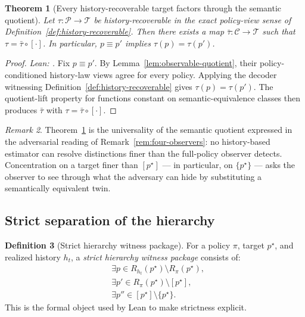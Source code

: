 \documentclass[11pt]{article}
\newtheorem{theorem}{Theorem}[section]
\theoremstyle{definition}
\newtheorem{definition}[theorem]{Definition}
\theoremstyle{remark}
\newtheorem{remark}[theorem]{Remark}
\theoremstyle{plain}
\theoremstyle{definition}
\newcommand{\Ccal}{\mathcal{C}}
\newcommand{\Pcal}{\mathcal{P}}
\begin{document}
\begin{theorem}[Every history-recoverable target factors through the semantic quotient]
\label{thm:factor-through-quotient}
Let $\tau:\Pcal\to\mathcal{T}$ be history-recoverable in the exact policy-view sense of Definition~\ref{def:history-recoverable}. Then there exists a map $\bar\tau:\Ccal\to\mathcal{T}$ such that $\tau=\bar\tau\circ[\cdot]$. In particular, $p\equiv p'$ implies $\tau(p)=\tau(p')$.
\end{theorem}

\begin{proof}
\noindent\emph{Lean: .}
Fix $p\equiv p'$. By Lemma~\ref{lem:observable-quotient}, their policy-conditioned history-law views agree for every policy. Applying the decoder witnessing Definition~\ref{def:history-recoverable} gives $\tau(p)=\tau(p')$. The quotient-lift property for functions constant on semantic-equivalence classes then produces $\bar\tau$ with $\tau=\bar\tau\circ[\cdot]$.
\end{proof}

\begin{remark}
Theorem~\ref{thm:factor-through-quotient} is the universality of the semantic quotient expressed in the adversarial reading of Remark~\ref{rem:four-observers}: no history-based estimator can resolve distinctions finer than the full-policy observer detects. Concentration on a target finer than $[p^\star]$ --- in particular, on $\{p^\star\}$ --- asks the observer to see through what the adversary can hide by substituting a semantically equivalent twin.
\end{remark}

\subsection{Strict separation of the hierarchy}

\begin{definition}[Strict hierarchy witness package]
\label{def:strict-hierarchy-witnesses}
For a policy $\pi$, target $p^\star$, and realized history $h_t$, a \emph{strict hierarchy witness package} consists of:
\[
\begin{aligned}
&\exists p\in R_{h_t}(p^\star)\setminus R_\pi(p^\star),\\
&\exists p'\in R_\pi(p^\star)\setminus[p^\star],\\
&\exists p''\in[p^\star]\setminus\{p^\star\}.
\end{aligned}
\]
This is the formal object used by Lean to make strictness explicit.
\end{definition}
\end{document}

